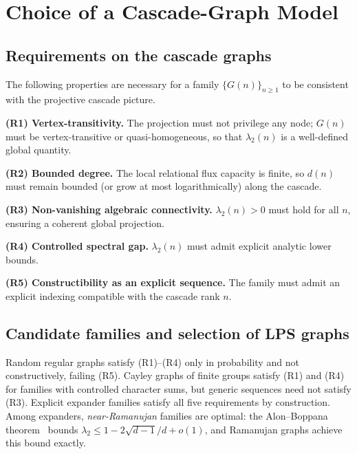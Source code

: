 \section{Choice of a Cascade-Graph Model}
  \label{sec:model}

  \subsection{Requirements on the cascade graphs}
    \label{sec:model:requirements}

    The following properties are necessary for a family $\{G(n)\}_{n \geq 1}$ to
    be consistent with the projective cascade picture.

    \medskip
    \noindent\textbf{(R1) Vertex-transitivity.}
    The projection must not privilege any node; $G(n)$ must be vertex-transitive
    or quasi-homogeneous, so that $\lambda_2(n)$ is a well-defined global quantity.

    \medskip
    \noindent\textbf{(R2) Bounded degree.}
    The local relational flux capacity is finite, so $d(n)$ must remain bounded
    (or grow at most logarithmically) along the cascade.

    \medskip
    \noindent\textbf{(R3) Non-vanishing algebraic connectivity.}
    $\lambda_2(n) > 0$ must hold for all $n$, ensuring a coherent global
    projection.

    \medskip
    \noindent\textbf{(R4) Controlled spectral gap.}
    $\lambda_2(n)$ must admit explicit analytic lower bounds.

    \medskip
    \noindent\textbf{(R5) Constructibility as an explicit sequence.}
    The family must admit an explicit indexing compatible with the cascade rank $n$.

  \subsection{Candidate families and selection of LPS graphs}
    \label{sec:model:candidates}

    Random regular graphs satisfy (R1)--(R4) only in probability and not
    constructively, failing (R5).
    Cayley graphs of finite groups satisfy (R1) and (R4) for families with
    controlled character sums, but generic sequences need not satisfy (R3).
    Explicit expander families satisfy all five requirements by construction.
    Among expanders, \emph{near-Ramanujan} families are optimal: the Alon--Boppana
    theorem~\cite{Alon1986} bounds $\lambda_2 \leq 1 - 2\sqrt{d-1}/d + o(1)$, and
    Ramanujan graphs achieve this bound exactly.

